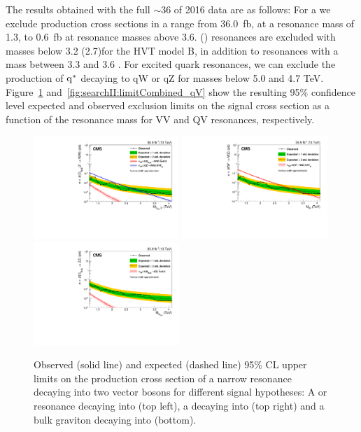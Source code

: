 The results obtained with the full $\sim 36$ \fbinv of 2016 data are as follows:
For a \BulkG we exclude production cross sections in a range from 36.0~fb, at a resonance mass of 1.3\TeV, to 0.6~fb at resonance masses above 3.6\TeV. \PWpr(\PZpr) resonances are excluded with masses below 3.2 (2.7)\TeV for the HVT model B, in addition to \PWpr resonances with a mass between 3.3 and 3.6 \TeV. For excited quark resonances, we can exclude the production of $\rm{q}^*$ decaying to qW or qZ for masses below 5.0 and 4.7 TeV.
Figure~\ref{fig:searchII:limitCombined_VV} and~\ref{fig:searchII:limitCombined_qV} show the resulting 95\% confidence level expected and observed exclusion limits on the signal cross section as a function of the resonance mass for VV and QV resonances, respectively.
\begin{figure}[h!]
\centering
    \includegraphics[width=0.49\textwidth]{figures/analysis/search2/B2G-17-001/figures/brazilianFlag_BulkWW_VVnew_new_combined_13TeV.pdf}
    \includegraphics[width=0.49\textwidth]{figures/analysis/search2/B2G-17-001/figures/brazilianFlag_WZ_VVnew_new_combined_13TeV.pdf}\\
    \includegraphics[width=0.49\textwidth]{figures/analysis/search2/B2G-17-001/figures/brazilianFlag_BulkZZ_VVnew_new_combined_13TeV.pdf}
\caption{Observed (solid line) and expected (dashed line) 95\% CL upper limits on the production cross section of a narrow resonance decaying into two vector bosons for different signal hypotheses: A \PZpr or \BulkG resonance decaying into \WW (top left), a \PZpr decaying into \PW\PZ (top right) and a bulk graviton decaying into \ZZ (bottom).}
\label{fig:searchII:limitCombined_VV}
\end{figure}
